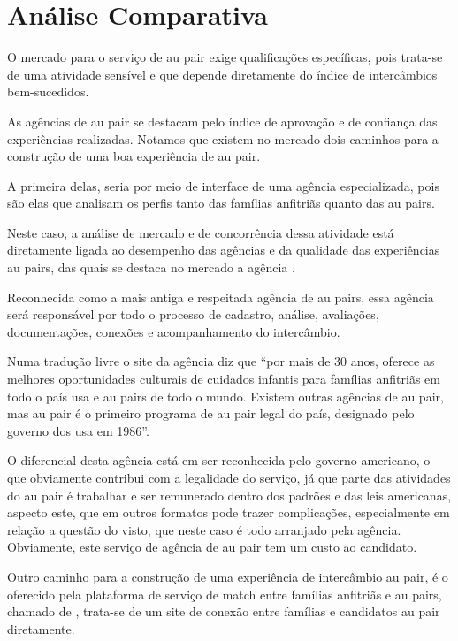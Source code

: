 \section{Análise Comparativa}
    O mercado para o serviço de au pair exige qualificações específicas, pois trata-se de uma atividade sensível e que depende diretamente do índice de intercâmbios bem-sucedidos.
    
    As agências de au pair se destacam pelo índice de aprovação e de confiança das experiências realizadas. 
    Notamos que existem no mercado dois caminhos para a construção de uma boa experiência de au pair.
    
    A primeira delas, seria por meio de interface de uma agência especializada, pois são elas que analisam os perfis tanto das famílias anfitriãs quanto das au pairs. 
    
    Neste caso, a análise de mercado e de concorrência dessa atividade está diretamente ligada ao desempenho das agências e da qualidade das experiências au pairs, das quais se destaca no mercado a agência
    \cite{auPairInAmerica2022}.
    
    Reconhecida como a mais antiga e respeitada agência de au pairs, essa agência será responsável por todo o processo de cadastro, análise, avaliações, documentações, conexões e acompanhamento do intercâmbio.
    
    Numa tradução livre o site da agência \cite{auPairInAmerica2022} diz que “por mais de 30 anos, oferece as melhores oportunidades culturais de cuidados infantis para famílias anfitriãs em todo o país \ac{usa} e au pairs de todo o mundo. Existem outras agências de au pair, mas au pair é o primeiro programa de au pair legal do país, designado pelo governo dos \ac{usa} em 1986”.
    
    O diferencial desta agência está em ser reconhecida pelo governo americano, o que obviamente contribui com a legalidade do serviço, já que parte das atividades do au pair é trabalhar e ser remunerado dentro dos padrões e das leis americanas, aspecto este, que em outros formatos pode trazer complicações, especialmente em relação a questão do visto, que neste caso é todo arranjado pela agência. Obviamente, este serviço de agência de au pair tem um custo ao candidato.
    
    Outro caminho para a construção de uma experiência de intercâmbio au pair, é o oferecido pela plataforma de serviço de \gls{match} entre famílias anfitriãs e au pairs, chamado de
    \cite{auPair.com2022}, trata-se de um site de conexão entre famílias e candidatos au pair diretamente. 
    
